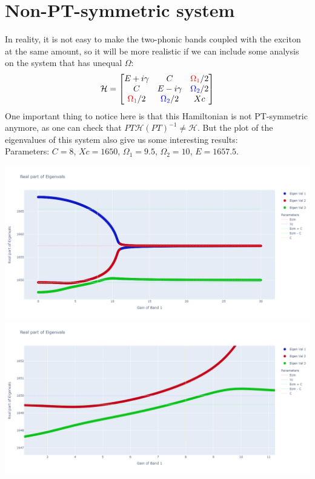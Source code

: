 \documentclass[1pt]{book}
\theoremstyle{break}
\theoremstyle{break}
\newcommand{\bmat}[1]{\begin{bmatrix} #1 \end{bmatrix}}
\begin{document}
\section{Non-PT-symmetric system}
In reality, it is not easy to make the two-phonic bands coupled with the exciton at the same amount, so it will be more realistic if we can include some analysis on the system that has unequal $\Omega$:
\begin{align*}
\mathcal{H} = \bmat{E+i\gamma & C & \color{red}\Omega_1\color{black}/2\\
     				C & E-i\gamma & \color{blue}\Omega_2\color{black}/2\\
     				\color{red}\Omega_1\color{black}/2 & \color{blue}\Omega_2\color{black}/2 & Xc}
\end{align*}
One important thing to notice here is that this Hamiltonian is not PT-symmetric anymore, as one can check that $PT\mathcal{H} (PT)^{-1} \neq \mathcal{H}$. But the plot of the eigenvalues of this system also give us some interesting results:\\

Parameters: $C = 8$, $Xc=1650$, $\Omega_1 = 9.5$, $\Omega_2 = 10$, $E = 1657.5$.
\begin{center}
\includegraphics[scale=0.25]{DiffRabiC.png}\\
\includegraphics[scale=0.25]{ZoomedDiffRabiC.png}
\end{center}
\end{document}
